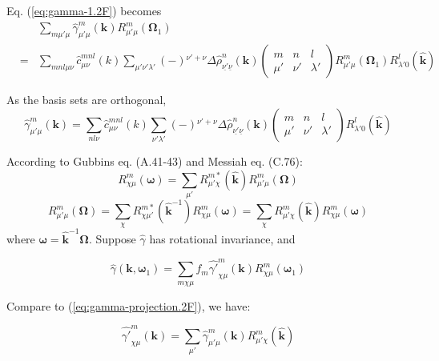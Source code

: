 Eq. (\ref{eq:gamma-1.2F}) becomes
\begin{eqnarray}
 &  & \sum_{m\mu'\mu}\hat{\gamma}_{\mu'\mu}^{m}(\mathbf{k})R_{\mu'\mu}^{m}(\mathbf{\Omega}_{1})\\
 & = & \sum_{mnl\mu\nu}\hat{c}_{\mu\nu}^{mnl}(k)\sum_{\mu'\nu'\lambda'}\left(-\right){}^{\nu'+\nu}\Delta\hat{\rho}_{\underline{\nu'}\underline{\nu}}^{n}(\mathbf{k})\left(\begin{array}{ccc}
m & n & l\\
\mu' & \nu' & \lambda'
\end{array}\right)R_{\mu'\mu}^{m}(\mathbf{\Omega}_{1})R_{\lambda'0}^{l}(\hat{\mathbf{k}})\nonumber 
\end{eqnarray}

As the basis sets are orthogonal,
\begin{equation}
\hat{\gamma}_{\mu'\mu}^{m}(\mathbf{k})=\sum_{nl\nu}\hat{c}_{\mu\nu}^{mnl}(k)\sum_{\nu'\lambda'}\left(-\right){}^{\nu'+\nu}\Delta\hat{\rho}_{\underline{\nu'}\underline{\nu}}^{n}(\mathbf{k})\left(\begin{array}{ccc}
m & n & l\\
\mu' & \nu' & \lambda'
\end{array}\right)R_{\lambda'0}^{l}(\hat{\mathbf{k}})\label{eq:im.2F}
\end{equation}

According to Gubbins eq. (A.41-43) and Messiah eq. (C.76):
\begin{equation}
R_{\chi\mu}^{m}(\boldsymbol{\omega})=\sum_{\mu'}R_{\mu'\chi}^{m*}(\hat{\mathbf{k}})R_{\mu'\mu}^{m}(\mathbf{\Omega})
\end{equation}
\begin{equation}
R_{\mu'\mu}^{m}(\mathbf{\Omega})=\sum_{\chi}R_{\chi\mu'}^{m*}(\hat{\mathbf{k}}^{-1})R_{\chi\mu}^{m}(\boldsymbol{\omega})=\sum_{\chi}R_{\mu'\chi}^{m}(\hat{\mathbf{k}})R_{\chi\mu}^{m}(\boldsymbol{\omega})
\end{equation}
where $\boldsymbol{\omega}=\hat{\mathbf{k}}^{-1}\mathbf{\Omega}$.
Suppose $\hat{\gamma}$ has rotational invariance, and

\begin{equation}
\hat{\gamma}(\mathbf{k},\boldsymbol{\omega}_{1})=\sum_{m\chi\mu}f_{m}\hat{\gamma'}_{\chi\mu}^{m}(\mathbf{k})R_{\chi\mu}^{m}(\boldsymbol{\omega}_{1})
\end{equation}

Compare to (\ref{eq:gamma-projection.2F}), we have:

\begin{equation}
\hat{\gamma'}_{\chi\mu}^{m}(\mathbf{k})=\sum_{\mu'}\hat{\gamma}_{\mu'\mu}^{m}(\mathbf{k})R_{\mu'\chi}^{m}(\hat{\mathbf{k}})\label{eq:gamma-p.2F}
\end{equation}

